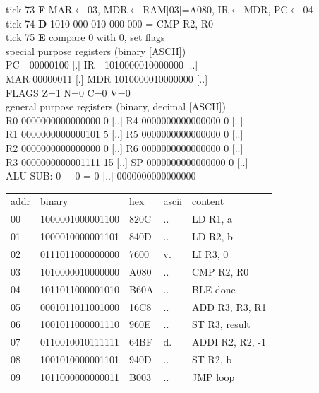 \noindent\begin{tcolorbox}[stepbox, title={Instruction 25 \hfill ticks 73 to 75 \quad CMP R2, R0}]
\textcolor{dim}{tick 73} \textbf{F} MAR$\leftarrow$03, MDR$\leftarrow$RAM[03]=A080, IR$\leftarrow$MDR, PC$\leftarrow$04\\
\textcolor{dim}{tick 74} \textbf{D} 1010 000 010 000 000 = CMP R2, R0\\
\textcolor{dim}{tick 75} \textbf{E} compare 0 with 0, set flags\\[2pt]
\textcolor{dim}{special purpose registers (binary [ASCII])}\\
PC~~00000100 [.] \hfill IR~~1010000010000000 [..]\\
MAR 00000011 [.] \hfill MDR 1010000010000000 [..]\\
FLAGS Z=1 N=0 C=0 V=0\\[2pt]
\textcolor{dim}{general purpose registers (binary, decimal [ASCII])}\\
R0 0000000000000000 0 [..] \hfill R4 0000000000000000 0 [..]\\
R1 0000000000000101 5 [..] \hfill R5 0000000000000000 0 [..]\\
R2 0000000000000000 0 [..] \hfill R6 0000000000000000 0 [..]\\
R3 0000000000001111 15 [..] \hfill SP 0000000000000000 0 [..]\\
\textcolor{dim}{ALU} SUB: 0 $-$ 0 = 0 [..] \hfill 0000000000000000\\[2pt]
{\setlength{\tabcolsep}{2pt}\begin{tabular}{@{}lllll@{}}
\textcolor{dim}{addr} & \textcolor{dim}{binary} & \textcolor{dim}{hex} & \textcolor{dim}{ascii} & \textcolor{dim}{content}\\
00 & 1000001000001100 & 820C & .. & LD R1, a\\
01 & 1000010000001101 & 840D & .. & LD R2, b\\
02 & 0111011000000000 & 7600 & v. & LI R3, 0\\
03 & 1010000010000000 & A080 & .. & CMP R2, R0\\
\rowcolor{pcc}04 & 1011011000001010 & B60A & .. & BLE done\\
05 & 0001011011001000 & 16C8 & .. & ADD R3, R3, R1\\
06 & 1001011000001110 & 960E & .. & ST R3, result\\
07 & 0110010010111111 & 64BF & d. & ADDI R2, R2, -1\\
08 & 1001010000001101 & 940D & .. & ST R2, b\\
09 & 1011000000000011 & B003 & .. & JMP loop\\

\end{tabular}}
\end{tcolorbox}
